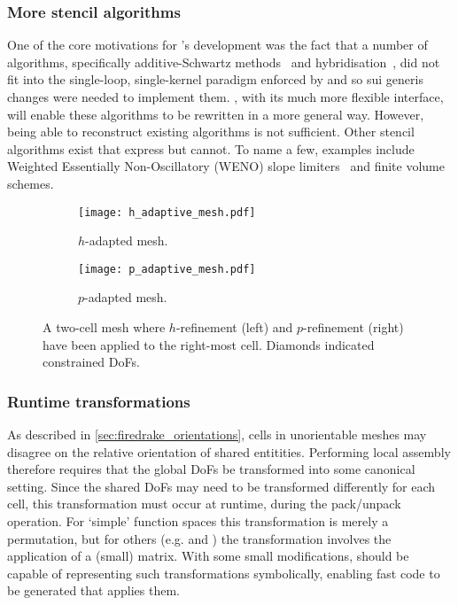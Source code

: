 \documentclass[thesis]{subfiles}
\begin{document}
\subsubsection{More stencil algorithms}

One of the core motivations for 's development was the fact that a number of algorithms, specifically additive-Schwartz methods~\cite{farrellPCPATCHSoftwareTopological2021} and hybridisation~\cite{gibsonSlateExtendingFiredrake2020}, did not fit into the single-loop, single-kernel paradigm enforced by  and so sui generis changes were needed to implement them.
, with its much more flexible interface, will enable these algorithms to be rewritten in a more general way.
However, being able to reconstruct existing algorithms is not sufficient.
Other stencil algorithms exist that  express but  cannot.
To name a few, examples include Weighted Essentially Non-Oscillatory (WENO) slope limiters~\cite{liuWeightedEssentiallyNonoscillatory1994} and finite volume schemes.

\begin{figure}
  \centering
  \begin{subfigure}{.49\textwidth}
    \centering
    \texttt{[image: h\_adaptive\_mesh.pdf]}
    \caption{$h$-adapted mesh.}
    \label{fig:h_adaptive_mesh}
  \end{subfigure}
  \begin{subfigure}{.49\textwidth}
    \centering
    \texttt{[image: p\_adaptive\_mesh.pdf]}
    \caption{$p$-adapted mesh.}
  \end{subfigure}

  \caption{
    A two-cell mesh where $h$-refinement (left) and $p$-refinement (right) have been applied to the right-most cell.
    Diamonds indicated constrained DoFs.
  }
  \label{fig:adaptive_mesh}
\end{figure}

\subsubsection{Runtime transformations}

As described in \cref{sec:firedrake_orientations}, cells in unorientable meshes may disagree on the relative orientation of shared entitities.
Performing local assembly therefore requires that the global DoFs be transformed into some canonical setting.
Since the shared DoFs may need to be transformed differently for each cell, this transformation must occur at runtime, during the pack/unpack operation.
For `simple' function spaces this transformation is merely a permutation, but for others (e.g. \hdiv and \hcurl) the transformation involves the application of a (small) matrix.
With some small modifications,  should be capable of representing such transformations symbolically, enabling fast code to be generated that applies them.
\end{document}
